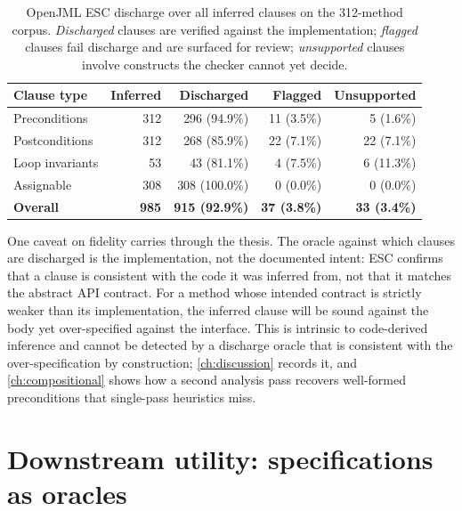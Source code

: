 \begin{table}[ht]
\centering
\caption{OpenJML ESC discharge over all inferred clauses on the 312-method corpus.
\emph{Discharged} clauses are verified against the implementation; \emph{flagged}
clauses fail discharge and are surfaced for review; \emph{unsupported} clauses
involve constructs the checker cannot yet decide.}
\label{tab:inf-discharge}
\begin{tabular}{lrrrr}
\toprule
\textbf{Clause type} & \textbf{Inferred} & \textbf{Discharged} & \textbf{Flagged} & \textbf{Unsupported} \\
\midrule
Preconditions   & 312 & 296 (94.9\%)  & 11 (3.5\%) &  5 (1.6\%)  \\
Postconditions  & 312 & 268 (85.9\%)  & 22 (7.1\%) & 22 (7.1\%)  \\
Loop invariants &  53 &  43 (81.1\%)  &  4 (7.5\%) &  6 (11.3\%) \\
Assignable      & 308 & 308 (100.0\%) &  0 (0.0\%) &  0 (0.0\%)  \\
\midrule
\textbf{Overall} & \textbf{985} & \textbf{915 (92.9\%)} & \textbf{37 (3.8\%)} & \textbf{33 (3.4\%)} \\
\bottomrule
\end{tabular}
\end{table}

One caveat on fidelity carries through the thesis. The oracle against which clauses
are discharged is the implementation, not the documented intent: ESC confirms that a
clause is consistent with the code it was inferred from, not that it matches the
abstract API contract. For a method whose intended contract is strictly weaker than
its implementation, the inferred clause will be sound against the body yet
over-specified against the interface. This is intrinsic to code-derived inference
and cannot be detected by a discharge oracle that is consistent with the
over-specification by construction; \cref{ch:discussion} records it, and
\cref{ch:compositional} shows how a second analysis pass recovers well-formed
preconditions that single-pass heuristics miss.

\section{Downstream utility: specifications as oracles}
\label{sec:inf-utility}

